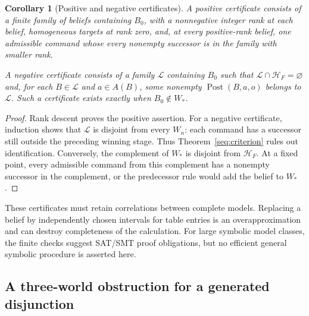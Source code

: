\documentclass[11pt]{article}
\newtheorem{corollary}[theorem]{Corollary}
\theoremstyle{definition}
\begin{document}
\begin{corollary}[Positive and negative certificates]
\label{seq:certificates}
A positive certificate consists of a finite family of beliefs containing
$B_0$, with a nonnegative integer rank at each belief, homogeneous targets
at rank zero, and, at every positive-rank belief, one admissible command
whose every nonempty successor is in the family with smaller rank.

A negative certificate consists of a family $\mathcal L$ containing $B_0$
such that $\mathcal L\cap\mathcal H_F=\varnothing$ and, for each
$B\in\mathcal L$ and $a\in A(B)$, some nonempty
$\operatorname{Post}(B,a,o)$ belongs to $\mathcal L$. Such a certificate
exists exactly when $B_0\notin W_*$.
\end{corollary}
\begin{proof}
Rank descent proves the positive assertion. For a negative certificate,
induction shows that $\mathcal L$ is disjoint from every $W_n$: each
command has a successor still outside the preceding winning stage. Thus
Theorem~\ref{seq:criterion} rules out identification. Conversely, the
complement of $W_*$ is disjoint from $\mathcal H_F$. At a fixed point, every
admissible command from this complement has a nonempty successor in the
complement, or the predecessor rule would add the belief to $W_*$.
\end{proof}

These certificates must retain correlations between complete models.
Replacing a belief by independently chosen intervals for table entries is
an overapproximation and can destroy completeness of the calculation.
For large symbolic model classes, the finite checks suggest SAT/SMT proof
obligations, but no efficient general symbolic procedure is asserted here.

\subsection{A three-world obstruction for a generated disjunction}
\end{document}
